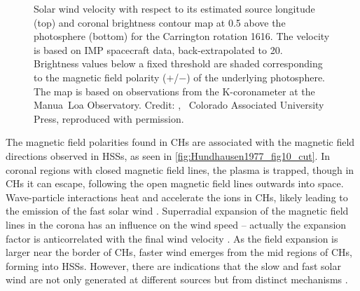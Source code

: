 \begin{figure}[htb]
\begin{floatrow}
{		}{
			\caption[]
			{Solar wind velocity with respect to its estimated source longitude (top) and coronal brightness contour map at \SI{0.5}{\Rs} above the photosphere (bottom) for the Carrington rotation 1616. The velocity is based on IMP spacecraft data, back-extrapolated to \SI{20}{\Rs}. Brightness values below a fixed threshold are shaded corresponding to the magnetic field polarity ($+$/$-$) of the underlying photosphere. The map is based on observations from the K-coronameter at the Manua~Loa Observatory. Credit: {\citet[Fig.~10]{Hundhausen1977}}, \textcopyright~Colorado Associated University Press, reproduced with permission.}
			\label{fig:Hundhausen1977_fig10_cut}
		}
	\end{floatrow}
\end{figure}
The magnetic field polarities found in CHs are associated with the magnetic field directions observed in HSSs, as seen in \autoref{fig:Hundhausen1977_fig10_cut}. In coronal regions with closed magnetic field lines, the plasma is trapped, though in CHs it can escape, following the open magnetic field lines outwards into space. Wave-particle interactions heat and accelerate the ions in CHs, likely leading to the emission of the fast solar wind \citep{Hollweg2002}. Superradial expansion of the magnetic field lines in the corona has an influence on the wind speed -- actually the expansion factor is anticorrelated with the final wind velocity \citep{Wang1990}. As the field expansion is larger near the border of CHs, faster wind emerges from the mid regions of CHs, forming into HSSs. However, there are indications that the slow and fast solar wind are not only generated at different sources but from distinct mechanisms \citep{McGregor2011b}.

